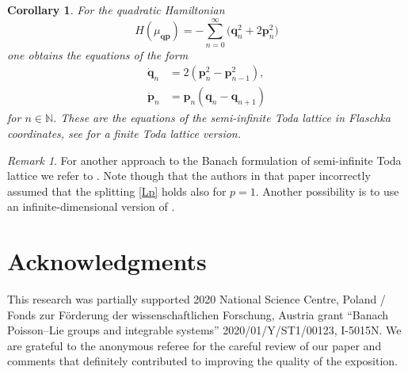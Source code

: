 \documentclass[a4paper,12pt,reqno]{amsart}%
\newtheorem{corollary}[theorem]{Corollary}
\theoremstyle{definition}
\theoremstyle{remark}
\newtheorem{remark}[theorem]{Remark}
\numberwithin{theorem}{section}
\numberwithin{equation}{section}
\newcommand{\1}{{\bf 1}}
\newcommand\N{{\mathbb{N}}}
\newcommand\p{{\mathbf{p}}}
\newcommand\q{{\mathbf{q}}}
\begin{document}
\begin{corollary}
For the quadratic Hamiltonian
    \[
    H(\mu_{\q\p}) = -\sum_{n=0}^\infty \big( \q_n^2  + 2\p_n^2 \big)
    \]
one obtains the equations of the form
  \begin{align*}
  \dot \q_n &= 2(\p_n^2 - \p_{n-1}^2),\\
  \dot \p_n &= \p_n \left(\q_n-\q_{n+1}\right)
  \end{align*}
for $n\in\N$. These are the equations of the semi-infinite Toda lattice in Flaschka coordinates, see \cite[Section~2.3]{magri90} for a finite Toda lattice version.
\end{corollary}

\begin{remark}
For another approach to the Banach formulation of semi-infinite Toda lattice we refer to \cite[Section~5]{Oind}. Note though that the authors in that paper incorrectly assumed that the splitting \eqref{Lp} holds also for $p=1$. Another possibility is to use an infinite-dimensional version of \cite[Section~15.2.2]{morrison2013}.
\end{remark}

\section*{Acknowledgments}

This research was partially supported 2020 National Science Centre, Poland / Fonds zur Förderung der wissenschaftlichen Forschung, Austria grant ``Banach Poisson--Lie groups and integrable systems'' 2020/01/Y/ST1/00123, I-5015N. We are grateful to the anonymous referee for the careful review of our paper and comments that definitely contributed to improving the quality of the exposition.



% 
\end{document}
